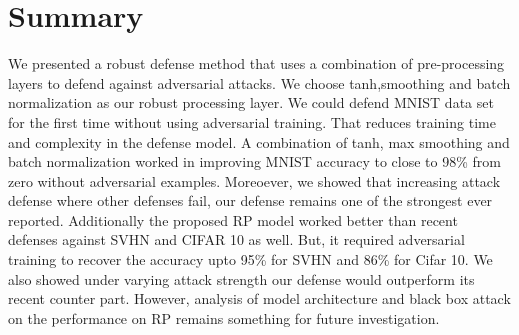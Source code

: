 \documentclass[conference]{IEEEtran}
\begin{document}
\section{Summary}
We presented a robust defense method that uses a combination of pre-processing layers to defend against adversarial attacks. We choose tanh,smoothing and batch normalization as our robust processing layer. We could defend MNIST data set for the first time without using adversarial training. That reduces training time and complexity in the defense model. A combination of tanh, max smoothing and batch normalization worked in improving MNIST accuracy to close to 98\% from zero without adversarial examples. Moreoever, we showed that increasing attack defense where other defenses fail, our defense remains one of the strongest ever reported. Additionally the proposed RP model worked better than recent defenses against SVHN and CIFAR 10 as well. But, it required adversarial training to recover the accuracy upto 95\% for SVHN and 86\% for Cifar 10. We also showed under varying attack strength our defense would outperform its recent counter part. However, analysis of model architecture and black box attack on the performance on RP remains something for future investigation.



\end{document}
